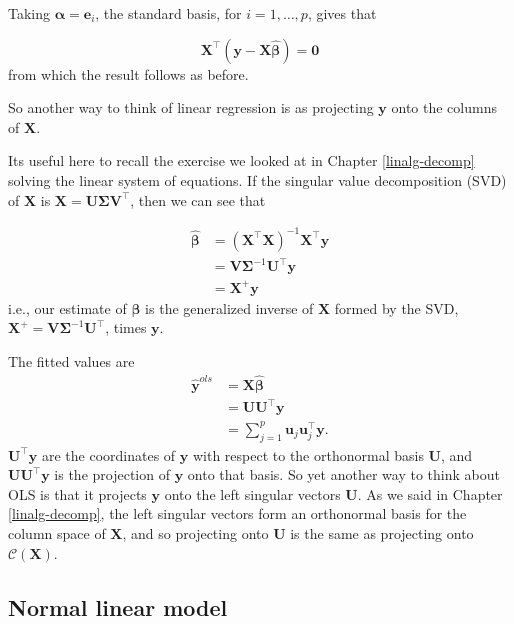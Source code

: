 \documentclass[
]{book}
\theoremstyle{definition}
\theoremstyle{definition}
\theoremstyle{definition}
\theoremstyle{definition}
\theoremstyle{remark}
\begin{document}
Taking \(\boldsymbol \alpha= \mathbf e_i\), the standard basis, for \(i=1, \ldots, p\), gives that

\[\mathbf X^\top(\mathbf y-\mathbf X\hat{\boldsymbol \beta})={\boldsymbol 0}\]
from which the result follows as before.

So another way to think of linear regression is as projecting \(\mathbf y\) onto the columns of \(\mathbf X\).

Its useful here to recall the exercise we looked at in Chapter \ref{linalg-decomp} solving the linear system of equations. If the singular value decomposition (SVD) of \(\mathbf X\) is \(\mathbf X= \mathbf U\boldsymbol{\Sigma}\mathbf V^\top\), then we can see that

\begin{align*}
\hat{\boldsymbol \beta}&=(\mathbf X^\top \mathbf X)^{-1}\mathbf X^\top \mathbf y\\
&=\mathbf V\boldsymbol{\Sigma}^{-1}\mathbf U^\top \mathbf y\\
&= \mathbf X^{+}\mathbf y
\end{align*}
i.e., our estimate of \(\boldsymbol \beta\) is the generalized inverse of \(\mathbf X\) formed by the SVD, \(\mathbf X^{+}=\mathbf V\boldsymbol{\Sigma}^{-1}\mathbf U^\top\), times \(\mathbf y\).

The fitted values are
\begin{align}
\hat{\mathbf y}^{ols} &= \mathbf X\hat{\boldsymbol \beta}\\
&=\mathbf U\mathbf U^\top \mathbf y\\
&=\sum_{j=1}^p \mathbf u_j \mathbf u_j^\top \mathbf y.\label{eq:lmsvd}
\end{align}
\(\mathbf U^\top \mathbf y\) are the coordinates of \(\mathbf y\) with respect to the orthonormal basis \(\mathbf U\), and \(\mathbf U\mathbf U^\top \mathbf y\) is the projection of \(\mathbf y\) onto that basis. So yet another way to think about OLS is that it projects \(\mathbf y\) onto the left singular vectors \(\mathbf U\). As we said in Chapter \ref{linalg-decomp}, the left singular vectors form an orthonormal basis for the column space of \(\mathbf X\), and so projecting onto \(\mathbf U\) is the same as projecting onto \(\mathcal{C}(\mathbf X)\).

\hypertarget{normal-linear-model}{%
\subsection{Normal linear model}\label{normal-linear-model}}
\end{document}

